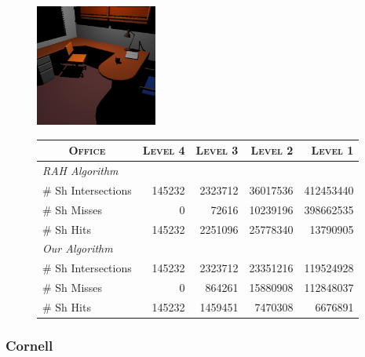 \begin{figure}[!htb]
    \begin{minipage}{0.25\linewidth}
        \centering
        \includegraphics[width=4.0cm]{Images/Office_Preview}
    \end{minipage}
    \begin{minipage}{0.725\linewidth}
        \centering
        \fontsize{8}{10}
        \selectfont
        \begin{tabular}[h]{l|rrrr}
            \multicolumn{1}{c|}{\textsc{Office}} & \textsc{Level 4} & \textsc{Level 3} & \textsc{Level 2} & \textsc{Level 1}\\
            \hline
            \emph{RAH Algorithm} & & \\
            \hline
            \quad \# Sh Intersections  & 145232	& 2323712   & 36017536	& 412453440	\\
            \quad \# Sh Misses         & 0		& 72616		& 10239196	& 398662535	\\
            \quad \# Sh Hits           & 145232	& 2251096	& 25778340	& 13790905	\\
            \hline
            \emph{Our Algorithm} & & \\
            \hline
            \quad \# Sh Intersections  & 145232	& 2323712	& 23351216	& 119524928	\\
            \quad \# Sh Misses         & 0		& 864261	& 15880908	& 112848037	\\
            \quad \# Sh Hits           & 145232	& 1459451	& 7470308	& 6676891	\\
        \end{tabular}
        \label{table:office-d16-n4-results}
    \end{minipage}
\end{figure}

\subsubsection{Cornell}

